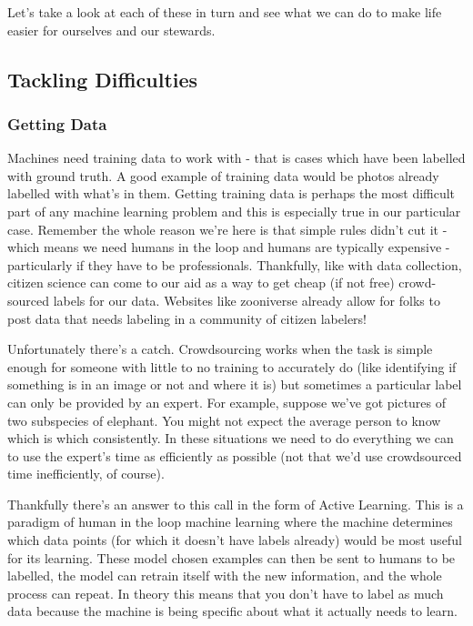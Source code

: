 \documentclass[10pt,a5paper]{book}
\begin{document}
Let's take a look at each of these in turn and see what we can do to make life easier for ourselves and our stewards.

\subsection{Tackling Difficulties}
\subsubsection{Getting Data}
Machines need training data to work with - that is cases which have been labelled with ground truth. A good example of training data would be photos already labelled with what's in them. Getting training data is perhaps the most difficult part of any machine learning problem and this is especially true in our particular case. Remember the whole reason we're here is that simple rules didn't cut it - which means we need humans in the loop and humans are typically expensive - particularly if they have to be professionals. Thankfully, like with data collection, citizen science can come to our aid as a way to get cheap (if not free) crowd-sourced labels for our data. Websites like zooniverse already allow for folks to post data that needs labeling in a community of citizen labelers! 

Unfortunately there's a catch. Crowdsourcing works when the task is simple enough for someone with little to no training to accurately do (like identifying if something is in an image or not and where it is) but sometimes a particular label can only be provided by an expert. For example, suppose we've got pictures of two subspecies of elephant. You might not expect the average person to know which is which consistently. In these situations we need to do everything we can to use the expert's time as efficiently as possible (not that we'd use crowdsourced time inefficiently, of course).

Thankfully there's an answer to this call in the form of Active Learning. This is a paradigm of human in the loop machine learning where the machine determines which data points (for which it doesn't have labels already) would be most useful for its learning. These model chosen examples can then be sent to humans to be labelled, the model can retrain itself with the new information, and the whole process can repeat. In theory this means that you don't have to label as much data because the machine is being specific about what it actually needs to learn.
\end{document}
